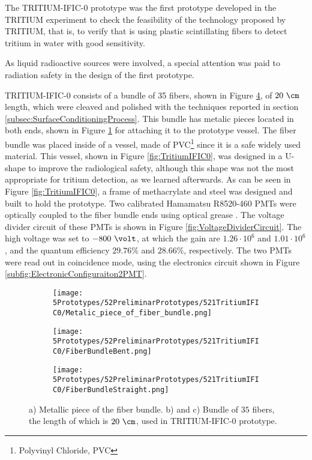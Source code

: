 The TRITIUM-IFIC-0 prototype was the first prototype developed in the TRITIUM experiment to check the feasibility of the technology proposed by TRITIUM, that is, to verify that is using plastic scintillating fibers to detect tritium in water with good sensitivity.

As liquid radioactive sources were involved, a special attention was paid to radiation safety in the design of the first prototype.

TRITIUM-IFIC-0 consists of a bundle of 35 fibers, shown in Figure \ref{fig:FiberBundleOfTritiumIFIC0}, of $20~\cm$ length, which were cleaved and polished with the techniques reported in section \ref{subsec:SurfaceConditioningProcess}. This bundle has metalic pieces located in both ends, shown in Figure \ref{subfig:MetalicPieceFiberBunchTritiumIFIC0} for attaching it to the prototype vessel. The fiber bundle was placed inside of a vessel, made of PVC\footnote{Polyvinyl Chloride, PVC}  since it is a safe widely used material. This vessel, shown in Figure \ref{fig:TritiumIFIC0}, was designed in a U-shape to improve the radiological safety, although this shape was not the most appropriate for tritium detection, as we learned afterwards. As can be seen in Figure \ref{fig:TritiumIFIC0}, a frame of methacrylate and steel was designed and built to hold the prototype. Two calibrated Hamamatsu R8520-460 PMTs \cite{DataSheetPMTs} were optically coupled to the fiber bundle ends using optical grease \cite{OpticalGrease}. The voltage divider circuit of these PMTs is shown in Figure  \ref{fig:VoltageDividerCircuit}. The high voltage was set to $-800~\volt$, at which the gain are $1.26 \cdot{} 10^6$ and $1.01 \cdot{} 10^6$, and the quantum efficiency $29.76\%$ and $28.66\%$, respectively. The two PMTs were read out in coincidence mode, using the electronics circuit shown in Figure \ref{subfig:ElectronicConfiguraiton2PMT}.

\begin{figure}
\centering
    \begin{subfigure}[b]{0.5\textwidth}
    \centering
    \texttt{[image: 5Prototypes/52PreliminarPrototypes/521TritiumIFIC0/Metalic\_piece\_of\_fiber\_bundle.png]}  
    \caption{\label{subfig:MetalicPieceFiberBunchTritiumIFIC0}}
    \end{subfigure}
    \hfill
    \begin{subfigure}[b]{0.4\textwidth}
    \centering
    \texttt{[image: 5Prototypes/52PreliminarPrototypes/521TritiumIFIC0/FiberBundleBent.png]}  
    \caption{\label{subfig:FiberBunchTritiumIFIC0Bent}}
    \end{subfigure}
    \hfill
    \begin{subfigure}[b]{0.7\textwidth}
    \centering
    \texttt{[image: 5Prototypes/52PreliminarPrototypes/521TritiumIFIC0/FiberBundleStraight.png]}  
    \caption{\label{subfig:FiberBunchTritiumIFIC0}}
    \end{subfigure}
 \caption{a) Metallic piece of the fiber bundle. b) and c) Bundle of $35$ fibers, the length of which is $20~\cm$, used in TRITIUM-IFIC-0 prototype.} \label{fig:FiberBundleOfTritiumIFIC0}
\end{figure}

